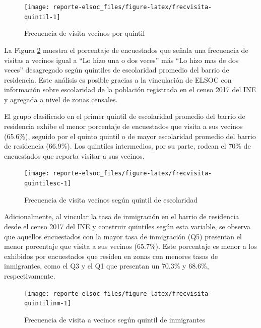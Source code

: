 \documentclass[
  12pt,
]{book}
\begin{document}
\begin{figure}

{\centering \texttt{[image: reporte-elsoc\_files/figure-latex/frecvisita-quintil-1]} 

}

\caption{Frecuencia de visita vecinos por quintil}\label{fig:frecvisita-quintil}
\end{figure}

La Figura \ref{fig:frecvisita-quintilesc} muestra el porcentaje de encuestados que señala una frecuencia de visitas a vecinos igual a ``Lo hizo una o dos veces'' más ``Lo hizo mas de dos veces'' desagregado según quintiles de escolaridad promedio del barrio de residencia. Este análisis es posible gracias a la vinculación de ELSOC con información sobre escolaridad de la población registrada en el censo 2017 del INE y agregada a nivel de zonas censales.

El grupo clasificado en el primer quintil de escolaridad promedio del barrio de residencia exhibe el menor porcentaje de encuestados que visita a sus vecinos (65.6\%), seguido por el quinto quintil o de mayor escolaridad promedio del barrio de residencia (66.9\%). Los quintiles intermedios, por su parte, rodean el 70\% de encuestados que reporta visitar a sus vecinos.

\begin{figure}

{\centering \texttt{[image: reporte-elsoc\_files/figure-latex/frecvisita-quintilesc-1]} 

}

\caption{Frecuencia de visita vecinos según quintil de  escolaridad}\label{fig:frecvisita-quintilesc}
\end{figure}

Adicionalmente, al vincular la tasa de inmigración en el barrio de residencia desde el censo 2017 del INE y construir quintiles según esta variable, se observa que aquellos encuestados con la mayor tasa de inmigración (Q5) presentan el menor porcentaje que visita a sus vecinos (65.7\%). Este porcentaje es menor a los exhibidos por encuestados que residen en zonas con menores tasas de inmigrantes, como el Q3 y el Q1 que presentan un 70.3\% y 68.6\%, respectivamente.

\begin{figure}

{\centering \texttt{[image: reporte-elsoc\_files/figure-latex/frecvisita-quintilinm-1]} 

}

\caption{Frecuencia de visita a vecinos según quintil de inmigrantes}\label{fig:frecvisita-quintilinm}
\end{figure}
\end{document}
